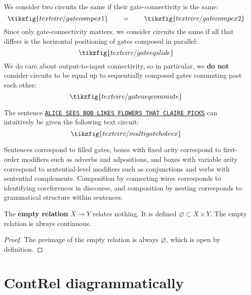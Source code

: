 \begin{convention}\label{conv:sliding}
We consider two circuits the same if their gate-connectivity is the same:
\[
\tikzfig{textcirc/gatecompex1} \quad\quad = \quad\quad \tikzfig{textcirc/gatecompex2}
\]
Since only gate-connectivity matters, we consider circuits the same if all that differs is the horizontal positioning of gates composed in parallel:
\[
\tikzfig{textcirc/gateeqslide} 
\]
We do care about output-to-input connectivity, so in particular, we {\bR\bf do not\e}
consider circuits to be equal up to sequentially composed gates commuting past each other:  
\[
\tikzfig{textcirc/gateneqcommute}  
\]
\end{convention}

\begin{example} 
The sentence \texttt{\underline{ALICE SEES BOB LIKES FLOWERS THAT CLAIRE PICKS}} can intuitively be given the following text circuit:
\[
\tikzfig{textcirc/multigateholeex}
\]
\end{example}

\begin{marginfigure}
    \centering
    \caption{Sentences correspond to filled gates, boxes with fixed arity correspond to first-order modifiers such as adverbs and adpositions, and boxes with variable arity correspond to sentential-level modifiers such as conjunctions and verbs with sentential complements. Composition by connecting wires corresponds to identifying coreferences in discourse, and composition by nesting corresponds to grammatical structure within sentences.}
    \label{fig:circuitgen}
\end{marginfigure}


\begin{proposition}
The \textbf{empty relation} $X \rightarrow Y$ relates nothing. It is defined $\varnothing \subset X \times Y$. The empty relation is always continuous.
\label{prop:emptyrel}
\begin{proof}
The preimage of the empty relation is always $\varnothing$, which is open by definition.
\end{proof}
\end{proposition}


\section{\textbf{ContRel} diagrammatically}

